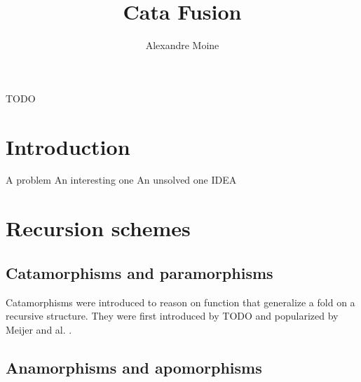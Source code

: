 \documentclass[sigplan]{acmart}
\begin{document}
\title{Cata Fusion}
\author{Alexandre Moine}


\begin{abstract}
\end{abstract}
	
%
%
\begin{CCSXML}
TODO
\end{CCSXML}
	
	
%
	
	
%
\maketitle

\section{Introduction}

A problem
An interesting one
An unsolved one
IDEA
	
\section{Recursion schemes}
\subsection{Catamorphisms and paramorphisms}
Catamorphisms were introduced to reason on function that generalize a fold on a recursive structure.
They were first introduced by TODO and popularized by Meijer and al. \cite{4cec4a43c86444479dc0003182424795}.

\subsection{Anamorphisms and apomorphisms}
\end{document}
